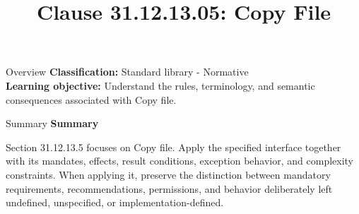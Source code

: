 \documentclass[10pt,letterpaper]{article}
\title{Clause 31.12.13.05: Copy File}
\author{}
\date{}
\begin{document}
\maketitle
\begin{CornellOverviewBox}{Overview}
\textbf{Classification:} Standard library - Normative\\[2pt]
\textbf{Learning objective:} Understand the rules, terminology, and semantic consequences associated with Copy file.
\end{CornellOverviewBox}\begin{CornellSummaryBox}{Summary}
{\sffamily\bfseries\color{Accent} Summary}\par\vspace{3pt}Section 31.12.13.5 focuses on Copy file. Apply the specified interface together with its mandates, effects, result conditions, exception behavior, and complexity constraints. When applying it, preserve the distinction between mandatory requirements, recommendations, permissions, and behavior deliberately left undefined, unspecified, or implementation-defined.
\end{CornellSummaryBox}
\end{document}
